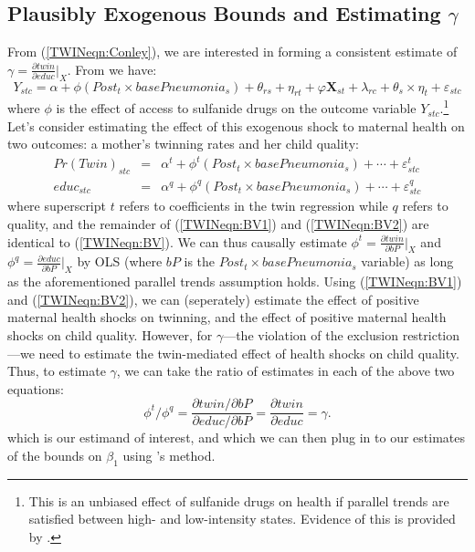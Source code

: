 \documentclass[subeqn]{article}
\begin{document}
\begin{spacing}{1.4}
\section{Plausibly Exogenous Bounds and Estimating $\gamma$}
\label{TWINscn:gamma}
From (\ref{TWINeqn:Conley}), we are interested in forming a consistent estimate
of $\gamma=\frac{\partial twin}{\partial educ}\big|_{X}$. From 
\citet{BhalotraVenkataramani2014} we have:
\begin{equation}
\label{TWINeqn:BV}
Y_{stc} = \alpha + \phi (Post_t\times basePneumonia_s) +\theta_{rs} +\eta_{rt}
+\varphi\mathbf{X}_{st}+\lambda_{rc}+\theta_s\times\eta_t+\varepsilon_{stc}
\end{equation}
where $\phi$ is the effect of access to sulfanide drugs on the outcome variable 
$Y_{stc}$.\footnote{This is an unbiased effect of sulfanide drugs on health if
parallel trends are satisfied between high- and low-intensity states. Evidence of
this is provided by \citet{BhalotraVenkataramani2014}.}
Let's consider estimating the effect of this exogenous shock to maternal health
on two outcomes: a mother's twinning rates and her child quality:
\begin{subequations}
\begin{eqnarray}
\label{TWINeqn:BV1}
Pr(Twin)_{stc} &=& \alpha^t + \phi^t (Post_t\times basePneumonia_s) +\cdots +\varepsilon^t_{stc} \\
\label{TWINeqn:BV2}
educ_{stc} &=& \alpha^q + \phi^q (Post_t\times basePneumonia_s) +\cdots+\varepsilon^q_{stc} 
\end{eqnarray}
\end{subequations}
where superscript $t$ refers to coefficients in the twin regression while $q$ refers to
quality, and the remainder of (\ref{TWINeqn:BV1}) and (\ref{TWINeqn:BV2}) are identical 
to (\ref{TWINeqn:BV}).  We can thus causally estimate 
$\phi^t=\frac{\partial twin}{\partial bP}\big|_{X}$ and
$\phi^q=\frac{\partial educ}{\partial bP}\big|_{X}$ by OLS (where $bP$ is the 
$Post_t\times basePneumonia_s$ variable) as long as the aforementioned parallel trends
assumption holds.  Using (\ref{TWINeqn:BV1}) and (\ref{TWINeqn:BV2}), we can (seperately) 
estimate the effect of positive maternal health shocks on twinning, and the effect of 
positive maternal health shocks on child quality.
However, for $\gamma$---the violation of the exclusion restriction---we need to estimate 
the twin-mediated effect of health shocks on child quality.  Thus, to estimate 
$\gamma$, we can take the ratio of estimates in each of the above two equations:
\begin{equation}
\label{TWINeqn:realgamma}
\phi^t/\phi^q=\frac{\partial twin/\partial bP}{\partial educ/\partial bP}=\frac{\partial twin}{\partial educ}=\gamma.
\end{equation}
which is our estimand of interest, and which we can then plug in to our estimates of
the bounds on $\beta_1$ using \citeauthor{Conleyetal2012}'s method.


\end{spacing}
\end{document}
